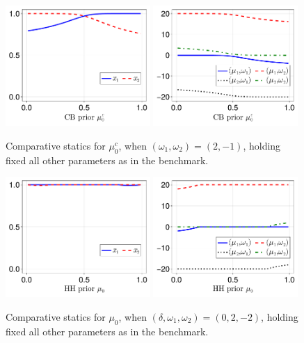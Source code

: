\documentclass[12pt,a4paper]{article}
\begin{document}
\begin{figure}[H]
\centering
\includegraphics[width=0.49\textwidth]{figures/V8/γ_10/fig_optimal_π_across_μ_0_c_ω_1_2_ω_2_-1_δ_0.5_.pdf}
\includegraphics[width=0.49\textwidth]{figures/V8/γ_10/fig_posterior_across_μ_0_c_ω_1_2_ω_2_-1_δ_0.5_.pdf}
\caption{Comparative statics for $\mu_0^c$, when $(\omega_1,\omega_2)=(2,-1)$, holding fixed all other parameters as in the benchmark.}
\label{FigureA8}
\end{figure}

\begin{figure}[H]
\centering
\includegraphics[width=0.49\textwidth]{figures/V8/γ_10/fig_optimal_π_across_μ_0_ω_1_2_ω_2_-2_δ_0.0_.pdf}
\includegraphics[width=0.49\textwidth]{figures/V8/γ_10/fig_posterior_across_μ_0_ω_1_2_ω_2_-2_δ_0.0_.pdf}
\caption{Comparative statics for $\mu_0$, when $(\delta,\omega_1,\omega_2)=(0,2,-2)$, holding fixed all other parameters as in the benchmark.}
\label{FigureA9}
\end{figure}
\end{document}

